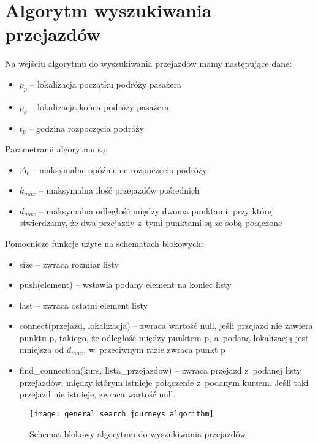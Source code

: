 \documentclass[eng,archivemode]{mgr}
\begin{document}
\section{Algorytm wyszukiwania przejazdów}
\label{sec:algorithm}
Na wejściu algorytmu do wyszukiwania przejazdów mamy następujące dane:
\begin{itemize}
	\item $p_{p}$ -- lokalizacja początku podróży pasażera
	\item $p_{k}$ -- lokalizacja końca podróży pasażera
	\item $t_{p}$ -- godzina rozpoczęcia podróży
\end{itemize}

Parametrami algorytmu są:
\begin{itemize}
	\item $\Delta_{t}$ -- maksymalne opóźnienie rozpoczęcia podróży
	\item $k_{max}$ -- maksymalna ilość przejazdów pośrednich
	\item $d_{max}$ -- maksymalna odległość między dwoma punktami, przy której stwierdzamy, że dwa przejazdy z~tymi punktami są ze sobą połączone
\end{itemize}

Pomocnicze funkcje użyte na schematach blokowych:
\begin{itemize}
	\item size -- zwraca rozmiar listy
	\item push(element) -- wstawia podany element na koniec listy
	\item last -- zwraca ostatni element listy
	\item connect(przejazd, lokalizacja) -- zwraca wartość null, jeśli przejazd nie zawiera punktu p, takiego, że odległość między punktem p, a~podaną lokalizacją jest mniejsza od $d_{max}$, w~przeciwnym razie zwraca punkt p
	\item find\_connection(kurs, lista\_przejazdow) -- zwraca przejazd z~podanej listy przejazdów, między którym istnieje połączenie z~podanym kursem. Jeśli taki przejazd nie istnieje, zwraca wartość null.
\end{itemize}

\begin{figure}[H]
	\centering
	\texttt{[image: general\_search\_journeys\_algorithm]}
	\caption{Schemat blokowy algorytmu do wyszukiwania przejazdów}
	\label{fig:general_search_journeys_algorithm}
\end{figure}
\end{document}
